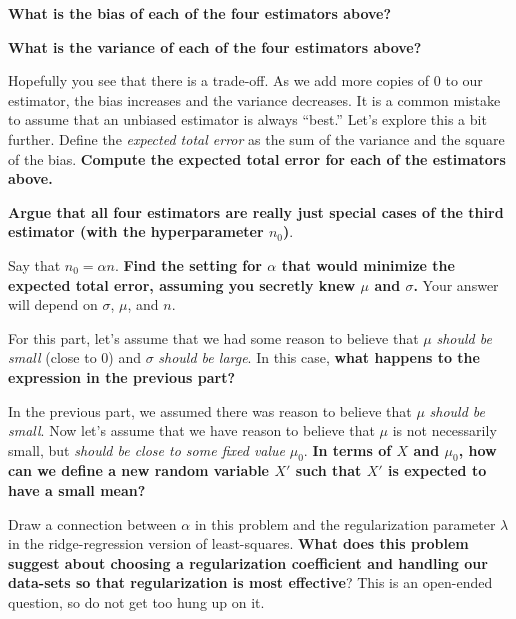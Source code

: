 \begin{Parts}
\Part \textbf{What is the bias of each of the four estimators above?}



\Part \textbf{What is the variance of each of the four estimators
  above?}



\Part Hopefully you see that there is a trade-off. As we add more
copies of $0$ to our estimator, the bias increases and the variance
decreases. It is a common mistake to assume that an unbiased estimator
is always ``best.'' Let's explore this a bit further. Define the
\emph{expected total error} as the sum of the variance and the square
of the bias. \textbf{Compute the expected total error for each of the estimators above.}



\Part \textbf{Argue that all four estimators are really just special cases of the third estimator (with the hyperparameter $n_0$)}.



\Part Say that $n_0 = \alpha n$. \textbf{Find the setting for $\alpha$
  that would minimize the expected total error, assuming you secretly
  knew $\mu$ and $\sigma$.} Your answer will depend on $\sigma$, $\mu$, and $n$.



\Part For this part, let's assume that we had some reason to believe that $\mu$ \emph{should be small} (close to $0$) and $\sigma$ \emph{should be large}. In this case, \textbf{what happens to the expression in the previous part?}


\Part In the previous part, we assumed there was reason to believe that $\mu$ \emph{should be small}. Now let's assume that we have reason to believe that $\mu$ is not necessarily small, but \emph{should be close to some fixed value} $\mu_0$. \textbf{In terms of $X$ and $\mu_0$, how can we define a new random variable $X'$ such that $X'$ is expected to have a small mean?}



\Part Draw a connection between $\alpha$ in this problem and the
regularization parameter $\lambda$ in the ridge-regression version of least-squares. \textbf{What does this problem suggest
  about choosing a regularization coefficient and handling our
  data-sets so that regularization is most effective}? This is an
open-ended question, so do not get too hung up on it. 



\end{Parts}

